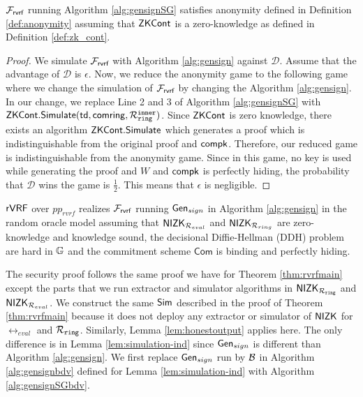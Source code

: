 \begin{lemma} \label{lem:anonymitySG} $ \mathcal{F}_{\textsf{rvrf}} $ running Algorithm \ref{alg:gensignSG} satisfies anonymity defined in Definition \ref{def:anonymity} assuming that ${\mathsf{ZKCont}} $ is a zero-knowledge as defined in Definition \ref{def:zk_cont}.
\end{lemma}

\begin{proof}
We simulate $ \mathcal{F}_{\textsf{rvrf}} $ with Algorithm \ref{alg:gensign} against $ \mathcal{D} $. Assume that the advantage of $ \mathcal{D} $ is $ \epsilon $. Now, we reduce the anonymity game to the following game where we change the simulation of $ \mathcal{F}_{\textsf{rvrf}} $ by changing the Algorithm \ref{alg:gensign}. In our change, we replace Line 2 and 3 of Algorithm \ref{alg:gensignSG} with $ {\mathsf{ZKCont}}.{\mathsf{Simulate}}(\mathsf{td}, \mathsf{comring},\mathcal{R}_{\mathtt{ring}}^{\mathtt{inner}}) $. Since $ {\mathsf{ZKCont}}$ is zero knowledge, there exists an algorithm  $ {\mathsf{ZKCont}}.{\mathsf{Simulate}}$ which generates a proof which is indistinguishable from the original proof and $ \mathsf{compk} $. Therefore, our reduced game is indistinguishable from the anonymity game. Since in this game, no  key is used while generating the proof and $ W $ and $ \mathsf{compk} $ is perfectly hiding, the probability that  $ \mathcal{D} $ wins the game is $ \frac{1}{2} $. This means that $ \epsilon $ is negligible.		
\end{proof}

\begin{theorem}\label{thm:rvrfzkcont}
$ {\mathsf{rVRF}} $  over  $ pp_{rvrf} $ realizes  $ \mathcal{F}_{\textsf{rvrf}} $ running $ \mathsf{Gen}_{sign} $ in Algorithm \ref{alg:gensign} \cite{canetti1,canetti2} in the random oracle model assuming that $ {\mathsf{NIZK}}_{\mathcal{R}_{eval}} $ and $ {\mathsf{NIZK}}_{\mathcal{R}_{ring}}$ are zero-knowledge and knowledge sound, the decisional Diffie-Hellman (DDH) problem are hard in $ {\mathbb{G}}  $  and the commitment scheme $ \mathsf{Com} $ is binding and perfectly hiding. 
\end{theorem}

The security proof follows the same proof we have for Theorem \ref{thm:rvrfmain} except the parts that we run extractor and simulator algorithms in $ {\mathsf{NIZK}}_{\mathcal{R}_{\mathtt{ring}}} $ and $ {\mathsf{NIZK}}_{\mathcal{R}_{eval}} $.
We construct the same $ \mathsf{Sim} $ described in the proof of Theorem \ref{thm:rvrfmain} because it does not deploy any extractor or simulator of $ {\mathsf{NIZK}} $ for $ \rel_{eval} $ and $ \mathcal{R}_{\mathtt{ring}} $. Similarly, Lemma \ref{lem:honestoutput} applies here. The only difference is in Lemma \ref{lem:simulation-ind} since $ \mathsf{Gen}_{sign} $ is different than Algorithm \ref{alg:gensign}.
We first replace $ \mathsf{Gen}_{sign} $ run by $ \mathcal{B} $ in Algorithm \ref{alg:gensignbdv} defined for Lemma \ref{lem:simulation-ind} with Algorithm \ref{alg:gensignSGbdv}.

